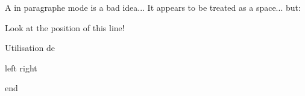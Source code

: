 \documentclass{basic}
\begin{document}

     \vspace*{1cm}

     \hspace{2cm}

     \vspace{1cm}

     A  in paragraphe mode \vspace{6cm} is a bad idea... It appears to be treated as a space... but:

     Look at the position of this line!

     Utilisation de 


     left \hfill right

     \vfill
     end
\end{document}
